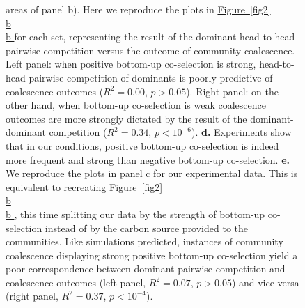 \documentclass[a4paper,10pt]{article}
\newcommand{\figref}[2][]{%
  \hyperref[{#2}]{%
    Figure~\ref*{#2}%
    \ifx\\#1\\%
    \else
      #1%
    \fi
  }%
}
\begin{document}
\begin{figure}[!h]
{areas of panel b). Here we reproduce the plots in \figref[b]{fig2} for each set, representing the
result of the dominant head-to-head pairwise competition versus the outcome of community coalescence.
Left panel: when positive bottom-up co-selection is strong, head-to-head pairwise competition of dominants
is poorly predictive of coalescence outcomes
($R^2=0.00$, $p>0.05$).
Right panel: on the other hand, when bottom-up co-selection is weak coalescence outcomes are more
strongly dictated by the result of the dominant-dominant competition
($R^2=0.34$, $p<10^{-6}$).
\textbf{d.} Experiments show that in our conditions, positive bottom-up co-selection is indeed more
frequent and strong than negative bottom-up co-selection.
\textbf{e.} We reproduce the plots in panel c for our experimental data. This is equivalent to recreating
\figref[b]{fig2}, this time splitting our data by the strength of bottom-up co-selection
instead of by the carbon source provided to the communities.
Like simulations predicted, instances of community coalescence displaying strong positive bottom-up co-selection
yield a poor correspondence between dominant pairwise competition and coalescence outcomes
(left panel, $R^2=0.07$, $p>0.05$)
and vice-versa
(right panel, $R^2=0.37$, $p<10^{-4}$).}
\label{fig3}
\end{figure}

\clearpage
\end{document}
